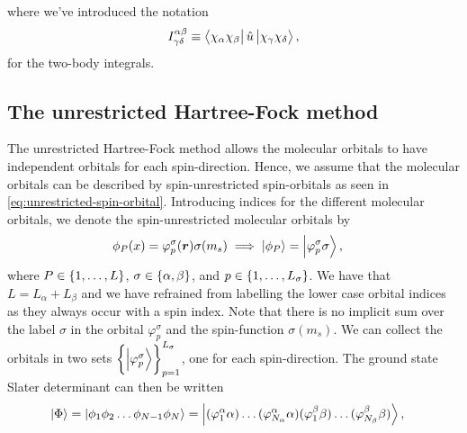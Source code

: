                 where we've introduced the notation
                \begin{align}
                    I^{\alpha\beta}_{\gamma\delta}
                    \equiv \bra{\chi_{\alpha}\chi_{\beta}}
                    \hat{u}
                    \ket{\chi_{\gamma}\chi_{\delta}},
                \end{align}
                for the two-body integrals.

        \subsection{The unrestricted Hartree-Fock method}
            The unrestricted Hartree-Fock method allows the molecular orbitals
            to have independent orbitals for each spin-direction.
            Hence, we assume that the molecular orbitals can be described by
            spin-unrestricted spin-orbitals as seen in
            \autoref{eq:unrestricted-spin-orbital}.
            Introducing indices for the different molecular orbitals, we denote
            the spin-unrestricted molecular orbitals by
            \begin{align}
                \phi_P(x)
                &=
                \varphi^{\sigma}_{p}(\boldsymbol{r})
                \sigma(m_s)
                \implies
                \ket{\phi_P}
                = \ket{\varphi^{\sigma}_{p}\sigma},
            \end{align}
            where $P \in \left\{ 1, \dots, L \right\}$, $\sigma \in \left\{ \alpha, \beta \right\}$,
            and $p \in \left\{ 1, \dots, L_{\sigma} \right\}$.
            We have that $L = L_{\alpha} + L_{\beta}$ and we have refrained from
            labelling the lower case orbital indices as they always occur with a
            spin index.
            Note that there is no implicit sum over the label $\sigma$ in the
            orbital $\varphi^{\sigma}_{p}$ and the spin-function $\sigma(m_s)$.
            We can collect the orbitals in two sets
            $\left\{ \ket{\varphi^{\sigma}_{p}} \right\}_{p = 1}^{L_{\sigma}}$, one for
            each spin-direction.
            The ground state Slater determinant can then be written
            \begin{align}
                \ket{\Phi}
                &=
                \ket{\phi_1 \phi_2 \dots \phi_{N - 1} \phi_N}
                =
                \ket{
                    (\varphi^{\alpha}_{1}\alpha)
                    \dots
                    (\varphi^{\alpha}_{N_{\alpha}}\alpha)
                    (\varphi^{\beta}_{1}\beta)
                    \dots
                    (\varphi^{\beta}_{N_{\beta}}\beta)
                },
            \end{align}
